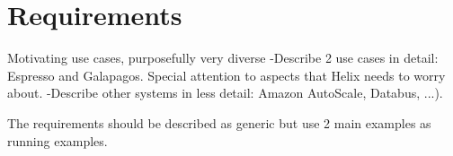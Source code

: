 \section{Requirements}
\label{sec:requirements}


Motivating use cases, purposefully very diverse
  -Describe 2 use cases in detail: Espresso and Galapagos.  Special attention to aspects that Helix needs to worry about.
  -Describe other systems in less detail: Amazon AutoScale, Databus, ...).

The requirements should be described as generic but use 2 main examples as running examples.


